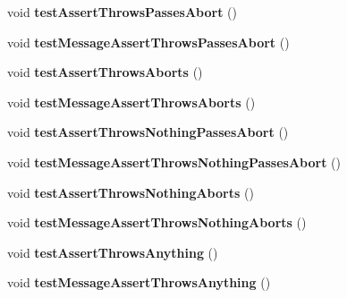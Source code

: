 \begin{DoxyCompactItemize}
\item 
\hypertarget{classDeepAbort_a38a0dd26d12a7bab6949d764abd5f202}{void {\bfseries test\-Assert\-Throws\-Passes\-Abort} ()}\label{classDeepAbort_a38a0dd26d12a7bab6949d764abd5f202}

\item 
\hypertarget{classDeepAbort_a6e6e93f4e97dbf50ef5b7e7dcb75e0c2}{void {\bfseries test\-Message\-Assert\-Throws\-Passes\-Abort} ()}\label{classDeepAbort_a6e6e93f4e97dbf50ef5b7e7dcb75e0c2}

\item 
\hypertarget{classDeepAbort_a8756ae3e53fc6b727790f514ada9ace4}{void {\bfseries test\-Assert\-Throws\-Aborts} ()}\label{classDeepAbort_a8756ae3e53fc6b727790f514ada9ace4}

\item 
\hypertarget{classDeepAbort_a23530cf70d20c47f1d55a25ca54742c8}{void {\bfseries test\-Message\-Assert\-Throws\-Aborts} ()}\label{classDeepAbort_a23530cf70d20c47f1d55a25ca54742c8}

\item 
\hypertarget{classDeepAbort_ab031f15c60b2e9497348f41dff362c34}{void {\bfseries test\-Assert\-Throws\-Nothing\-Passes\-Abort} ()}\label{classDeepAbort_ab031f15c60b2e9497348f41dff362c34}

\item 
\hypertarget{classDeepAbort_a1bcacde1855a1db02028bdad32dfd7ce}{void {\bfseries test\-Message\-Assert\-Throws\-Nothing\-Passes\-Abort} ()}\label{classDeepAbort_a1bcacde1855a1db02028bdad32dfd7ce}

\item 
\hypertarget{classDeepAbort_ab9089cca8ff1e5a3884c7f9e44d0fcca}{void {\bfseries test\-Assert\-Throws\-Nothing\-Aborts} ()}\label{classDeepAbort_ab9089cca8ff1e5a3884c7f9e44d0fcca}

\item 
\hypertarget{classDeepAbort_ab236df3e2cfb517005d5087e6483ccd3}{void {\bfseries test\-Message\-Assert\-Throws\-Nothing\-Aborts} ()}\label{classDeepAbort_ab236df3e2cfb517005d5087e6483ccd3}

\item 
\hypertarget{classDeepAbort_ab5112f124fb46b8d000f4e26e5a9e01d}{void {\bfseries test\-Assert\-Throws\-Anything} ()}\label{classDeepAbort_ab5112f124fb46b8d000f4e26e5a9e01d}

\item 
\hypertarget{classDeepAbort_aa5f1304b8ccb92805b77c0cb69359883}{void {\bfseries test\-Message\-Assert\-Throws\-Anything} ()}\label{classDeepAbort_aa5f1304b8ccb92805b77c0cb69359883}


\end{DoxyCompactItemize}
